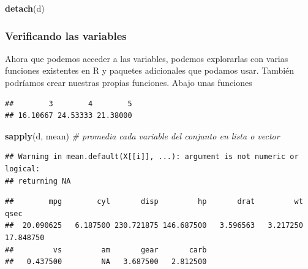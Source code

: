 \documentclass[
]{article}
\newenvironment{Shaded}{\begin{snugshade}}{\end{snugshade}}
\newcommand{\CommentTok}[1]{\textcolor[rgb]{0.56,0.35,0.01}{\textit{#1}}}
\newcommand{\FunctionTok}[1]{\textcolor[rgb]{0.13,0.29,0.53}{\textbf{#1}}}
\newcommand{\NormalTok}[1]{#1}
\newcommand{\SpecialCharTok}[1]{\textcolor[rgb]{0.81,0.36,0.00}{\textbf{#1}}}
\begin{document}
\begin{Shaded}
\begin{Highlighting}[]
\FunctionTok{detach}\NormalTok{(d)}
\end{Highlighting}
\end{Shaded}

\subsubsection{Verificando las
variables}\label{verificando-las-variables}

Ahora que podemos acceder a las variables, podemos explorarlas con
varias funciones existentes en R y paquetes adicionales que podamos
usar. También podríamos crear nuestras propias funciones. Abajo unas
funciones

\begin{Shaded}
\end{Shaded}

\begin{verbatim}
##        3        4        5 
## 16.10667 24.53333 21.38000
\end{verbatim}

\begin{Shaded}
\begin{Highlighting}[]
\FunctionTok{sapply}\NormalTok{(d, mean) }\CommentTok{\# promedia cada variable del conjunto en lista o vector}
\end{Highlighting}
\end{Shaded}

\begin{verbatim}
## Warning in mean.default(X[[i]], ...): argument is not numeric or logical:
## returning NA
\end{verbatim}

\begin{verbatim}
##        mpg        cyl       disp         hp       drat         wt       qsec 
##  20.090625   6.187500 230.721875 146.687500   3.596563   3.217250  17.848750 
##         vs         am       gear       carb 
##   0.437500         NA   3.687500   2.812500
\end{verbatim}

\begin{Shaded}
\end{Shaded}
\end{document}
